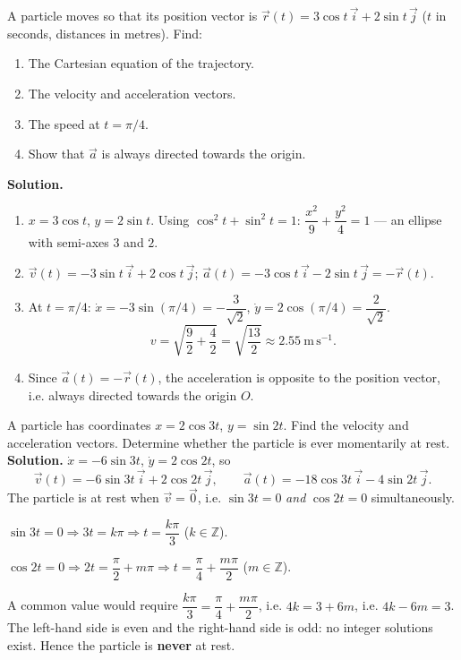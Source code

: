 \documentclass[11pt]{article}
\begin{document}
\begin{exoresolu}
A particle moves so that its position vector is $\vec{r}(t) = 3\cos t\,\vec{i} + 2\sin t\,\vec{j}$ ($t$ in seconds, distances in metres). Find:
\begin{enumerate}
\item The Cartesian equation of the trajectory.
\item The velocity and acceleration vectors.
\item The speed at $t = \pi/4$.
\item Show that $\vec{a}$ is always directed towards the origin.
\end{enumerate}
\tcblower
\textbf{Solution.}
\begin{enumerate}
\item $x = 3\cos t$, $y = 2\sin t$. Using $\cos^2 t + \sin^2 t = 1$: $\dfrac{x^2}{9} + \dfrac{y^2}{4} = 1$ — an ellipse with semi-axes $3$ and $2$.
\item $\vec{v}(t) = -3\sin t\,\vec{i} + 2\cos t\,\vec{j}$; \quad $\vec{a}(t) = -3\cos t\,\vec{i} - 2\sin t\,\vec{j} = -\vec{r}(t)$.
\item At $t = \pi/4$: $\dot{x} = -3\sin(\pi/4) = -\dfrac{3}{\sqrt{2}}$, $\dot{y} = 2\cos(\pi/4) = \dfrac{2}{\sqrt{2}}$.
\[
v = \sqrt{\frac{9}{2} + \frac{4}{2}} = \sqrt{\frac{13}{2}} \approx 2.55\ \mathrm{m\,s^{-1}}.
\]
\item Since $\vec{a}(t) = -\vec{r}(t)$, the acceleration is opposite to the position vector, i.e. always directed towards the origin $O$.
\end{enumerate}
\end{exoresolu}

\begin{exoresolu}
A particle has coordinates $x = 2\cos 3t$, $y = \sin 2t$. Find the velocity and acceleration vectors. Determine whether the particle is ever momentarily at rest.
\tcblower
\textbf{Solution.}
$\dot{x} = -6\sin 3t$, $\dot{y} = 2\cos 2t$, so
\[
\vec{v}(t) = -6\sin 3t\,\vec{i} + 2\cos 2t\,\vec{j}, \qquad
\vec{a}(t) = -18\cos 3t\,\vec{i} - 4\sin 2t\,\vec{j}.
\]
The particle is at rest when $\vec{v} = \vec{0}$, i.e. $\sin 3t = 0$ \emph{and} $\cos 2t = 0$ simultaneously.

$\sin 3t = 0 \Rightarrow 3t = k\pi \Rightarrow t = \dfrac{k\pi}{3}$ ($k \in \mathbb{Z}$).

$\cos 2t = 0 \Rightarrow 2t = \dfrac{\pi}{2} + m\pi \Rightarrow t = \dfrac{\pi}{4} + \dfrac{m\pi}{2}$ ($m \in \mathbb{Z}$).

A common value would require $\dfrac{k\pi}{3} = \dfrac{\pi}{4} + \dfrac{m\pi}{2}$, i.e. $4k = 3 + 6m$, i.e. $4k - 6m = 3$. The left-hand side is even and the right-hand side is odd: no integer solutions exist. Hence the particle is \textbf{never} at rest.
\end{exoresolu}
\end{document}
